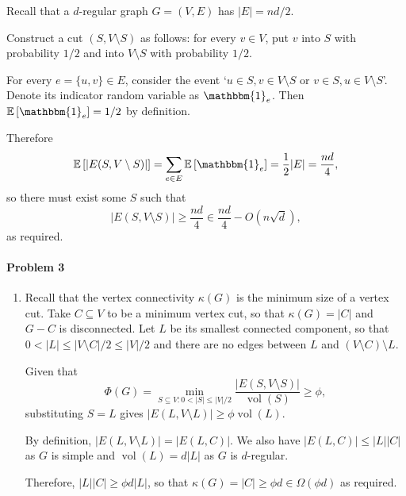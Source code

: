 \documentclass[12pt]{article}
\DeclareMathOperator{\vol}{vol}
\begin{document}
\begin{enumerate}[label=\alph*., font=\bfseries]
Recall that a $d$-regular graph $G=(V,E)$ has $|E|=nd/2$.

Construct a cut $(S,V\setminus S)$ as follows: for every $v\in V$, put $v$ into $S$ with probability $1/2$ and into $V\setminus S$ with probability $1/2$.

For every $e=\{u,v\}\in E$, consider the event `$u\in S, v\in V\setminus S$ or $v\in S, u\in V\setminus S$'. Denote its indicator random variable as $\mathbbm{1}_e$. Then $\mathbb{E}\left[\mathbbm{1}_e\right]=1/2$ by definition.

Therefore $$\mathbb{E}\left[|E(S, V\setminus S)|\right]=\sum_{e\in E}\mathbb{E}\left[\mathbbm{1}_e\right]=\frac{1}{2}|E|=\frac{nd}{4},$$
so there must exist some $S$ such that $$|E(S, V\setminus S)|\ge\frac{nd}{4}\in\frac{nd}{4}-O\left(n\sqrt d\right),$$
as required.
\end{enumerate}
\newpage
\paragraph{Problem 3}
\begin{enumerate}[label=\alph*., font=\bfseries]
\item Recall that the vertex connectivity $\kappa(G)$ is the minimum size of a vertex cut. Take $C\subseteq V$ to be a minimum vertex cut, so that $\kappa(G)=|C|$ and $G-C$ is disconnected. Let $L$ be its smallest connected component, so that $0<|L|\le |V\setminus C|/2\le |V|/2$ and there are no edges between $L$ and $(V\setminus C)\setminus L$.

Given that $$\Phi(G)=\min_{S\subseteq V:0<|S|\le |V|/2}\frac{|E(S,V\setminus S)|}{\vol(S)}\ge\phi,$$
substituting $S=L$ gives $|E(L,V\setminus L)|\ge\phi\vol(L)$.

By definition, $|E(L,V\setminus L)|=|E(L, C)|$. We also have $|E(L, C)|\le |L||C|$ as $G$ is simple and $\vol(L)=d|L|$ as $G$ is $d$-regular.

Therefore, $|L||C|\ge \phi d|L|$, so that $\kappa(G)=|C|\ge\phi d\in\Omega(\phi d)$ as required.
\end{enumerate}
\newpage
\end{document}
